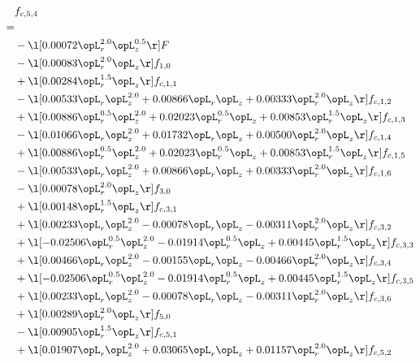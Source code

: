 \begin{alignat}{2} 
\label{eq:f_54_1} 
& f_{c,5,4} \nonumber \\ 
 = \\ 
& - \l[  0.00072 \opL_r^{2.0} \opL_z^{0.5}  \r] F \nonumber \\ 
& - \l[  0.00083 \opL_r^{2.0} \opL_z  \r] f_{1,0} \nonumber \\ 
& + \l[  0.00284 \opL_r^{1.5} \opL_z  \r] f_{c,1,1} \nonumber \\ 
& - \l[  0.00533 \opL_r \opL_z^{2.0} +  0.00866 \opL_r \opL_z +  0.00333 \opL_r^{2.0} \opL_z  \r] f_{c,1,2} \nonumber \\ 
& + \l[  0.00886 \opL_r^{0.5} \opL_z^{2.0} +  0.02023 \opL_r^{0.5} \opL_z +  0.00853 \opL_r^{1.5} \opL_z  \r] f_{c,1,3} \nonumber \\ 
& - \l[  0.01066 \opL_r \opL_z^{2.0} +  0.01732 \opL_r \opL_z +  0.00500 \opL_r^{2.0} \opL_z  \r] f_{c,1,4} \nonumber \\ 
& + \l[  0.00886 \opL_r^{0.5} \opL_z^{2.0} +  0.02023 \opL_r^{0.5} \opL_z +  0.00853 \opL_r^{1.5} \opL_z  \r] f_{c,1,5} \nonumber \\ 
& - \l[  0.00533 \opL_r \opL_z^{2.0} +  0.00866 \opL_r \opL_z +  0.00333 \opL_r^{2.0} \opL_z  \r] f_{c,1,6} \nonumber \\ 
& - \l[  0.00078 \opL_r^{2.0} \opL_z  \r] f_{3,0} \nonumber \\ 
& + \l[  0.00148 \opL_r^{1.5} \opL_z  \r] f_{c,3,1} \nonumber \\ 
& + \l[  0.00233 \opL_r \opL_z^{2.0}   -0.00078 \opL_r \opL_z   -0.00311 \opL_r^{2.0} \opL_z  \r] f_{c,3,2} \nonumber \\ 
& + \l[  -0.02506 \opL_r^{0.5} \opL_z^{2.0}   -0.01914 \opL_r^{0.5} \opL_z +  0.00445 \opL_r^{1.5} \opL_z  \r] f_{c,3,3} \nonumber \\ 
& + \l[  0.00466 \opL_r \opL_z^{2.0}   -0.00155 \opL_r \opL_z   -0.00466 \opL_r^{2.0} \opL_z  \r] f_{c,3,4} \nonumber \\ 
& + \l[  -0.02506 \opL_r^{0.5} \opL_z^{2.0}   -0.01914 \opL_r^{0.5} \opL_z +  0.00445 \opL_r^{1.5} \opL_z  \r] f_{c,3,5} \nonumber \\ 
& + \l[  0.00233 \opL_r \opL_z^{2.0}   -0.00078 \opL_r \opL_z   -0.00311 \opL_r^{2.0} \opL_z  \r] f_{c,3,6} \nonumber \\ 
& + \l[  0.00289 \opL_r^{2.0} \opL_z  \r] f_{5,0} \nonumber \\ 
& - \l[  0.00905 \opL_r^{1.5} \opL_z  \r] f_{c,5,1} \nonumber \\ 
& + \l[  0.01907 \opL_r \opL_z^{2.0} +  0.03065 \opL_r \opL_z +  0.01157 \opL_r^{2.0} \opL_z  \r] f_{c,5,2} \nonumber \\ 

\end{alignat}
